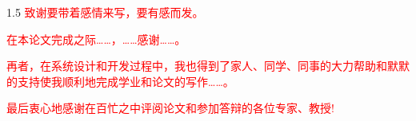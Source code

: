 
\begin{zhixie}
\begin{spacing}{1.5}
\textcolor{red}{致谢要带着感情来写，要有感而发。}

\textcolor{red}{在本论文完成之际……，……感谢……。}

\textcolor{red}{再者，在系统设计和开发过程中，我也得到了家人、同学、同事的大力帮助和默默的支持使我顺利地完成学业和论文的写作……。}

\textcolor{red}{最后衷心地感谢在百忙之中评阅论文和参加答辩的各位专家、教授!}
\end{spacing}
\end{zhixie}
